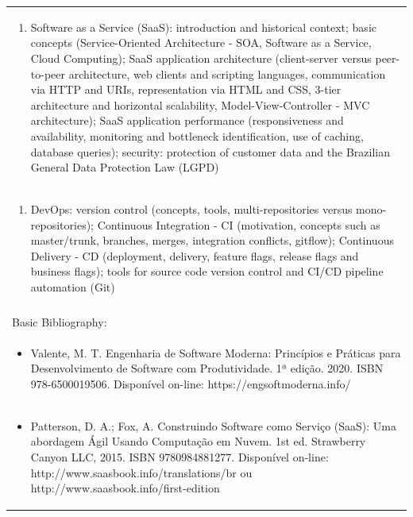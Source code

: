\documentclass[11pt]{article}
\begin{document}
\begin{center}
\begin{longtable}{|p{4cm}|p{4cm}|p{4cm}|p{4cm}|}
\multicolumn{4}{|p{\dimexpr 16cm + 6\tabcolsep\relax}|}{\begin{enumerate}[start=4]\item Software as a Service (SaaS): introduction and historical context; basic concepts (Service-Oriented Architecture - SOA, Software as a Service, Cloud Computing); SaaS application architecture (client-server versus peer-to-peer architecture, web clients and scripting languages, communication via HTTP and URIs, representation via HTML and CSS, 3-tier architecture and horizontal scalability, Model-View-Controller - MVC architecture); SaaS application performance (responsiveness and availability, monitoring and bottleneck identification, use of caching, database queries); security: protection of customer data and the Brazilian General Data Protection Law (LGPD)\end{enumerate}}\\
\multicolumn{4}{|p{\dimexpr 16cm + 6\tabcolsep\relax}|}{\begin{enumerate}[start=5]\item DevOps: version control (concepts, tools, multi-repositories versus mono-repositories); Continuous Integration - CI (motivation, concepts such as master/trunk, branches, merges, integration conflicts, gitflow); Continuous Delivery - CD (deployment, delivery, feature flags, release flags and business flags); tools for source code version control and CI/CD pipeline automation (Git)\end{enumerate}}\\
\multicolumn{4}{|p{\dimexpr 16cm + 6\tabcolsep\relax}|}{}\\
\hline
\multicolumn{4}{|p{16cm}|}{Basic Bibliography:}\\*
\multicolumn{4}{|p{\dimexpr 16cm + 6\tabcolsep\relax}|}{\begin{itemize}\item Valente, M. T. Engenharia de Software Moderna: Princípios e Práticas para Desenvolvimento de Software com Produtividade. 1ª edição. 2020. ISBN 978-6500019506. Disponível on-line: https://engsoftmoderna.info/\end{itemize}}\\
\multicolumn{4}{|p{\dimexpr 16cm + 6\tabcolsep\relax}|}{\begin{itemize}\item Patterson, D. A.; Fox, A. Construindo Software como Serviço (SaaS): Uma abordagem Ágil Usando Computação em Nuvem. 1st ed. Strawberry Canyon LLC, 2015. ISBN 9780984881277. Disponível on-line: http://www.saasbook.info/translations/br ou http://www.saasbook.info/first-edition\end{itemize}}\\

\end{longtable}
\end{center}
\end{document}

